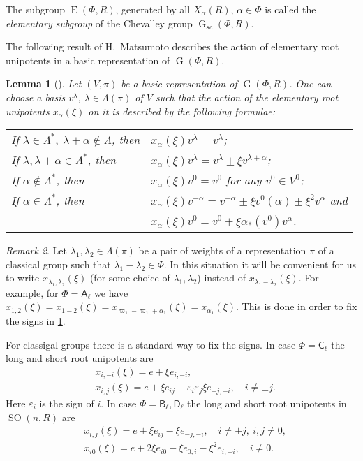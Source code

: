 \documentclass[12pt]{amsart}
\theoremstyle{plain} \declaretheorem[name=Theorem, Refname={Theorem,Theorems}]{thm} \Crefname{thm}{Theorem}{Theorems}
\numberwithin{equation}{section}
\newtheorem{lemma}{Lemma} \numberwithin{lemma}{section} \Crefname{lemma}{Lemma}{Lemmas}
\theoremstyle{definition} \newtheorem{dfn}[lemma]{Definition} \Crefname{dfn}{Definition}{Definitions}
\theoremstyle{remark} \newtheorem{rem}[lemma]{Remark} \Crefname{rem}{Remark}{Remarks}
\DeclareMathOperator{\G}{G}
\DeclareMathOperator{\SO}{SO}
\DeclareMathOperator{\E}{E}
\newcommand{\rA}{\mathsf{A}}
\newcommand{\rB}{\mathsf{B}}
\newcommand{\rC}{\mathsf{C}}
\newcommand{\rD}{\mathsf{D}}
\begin{document}
The subgroup $\E(\Phi, R)$, generated by all $X_\alpha(R)$, $\alpha\in\Phi$ is called the {\it elementary subgroup} of the Chevalley group $\G_{sc}(\Phi, R)$.

The following result of H.~Matsumoto describes the action of elementary root unipotents in a basic representation of $\G(\Phi, R)$.
\begin{lemma}[{\cite[Lemma~2.3]{Ma69}}]\label{lemma:Matsumoto}
Let $(V, \pi)$ be a basic representation of $\G(\Phi, R)$.
One can choose a basis $v^\lambda$, $\lambda\in\Lambda(\pi)$ of $V$ such that the action of the elementary root unipotents $x_\alpha(\xi)$ on it is described by the following formulae:
 
\begin{tabular}{ll}
If $\lambda\in\Lambda^*,\ \lambda+\alpha\notin\Lambda$, then & $x_\alpha(\xi)v^\lambda=v^\lambda$; \\
If $\lambda,\lambda+\alpha\in\Lambda^*$, then & $x_\alpha(\xi)v^\lambda=v^\lambda\pm\xi v^{\lambda+\alpha}$; \\
If $\alpha\notin\Lambda^*$, then & $x_\alpha(\xi)v^0=v^0$ for any $v^0\in V^0$; \\
If $\alpha\in\Lambda^*$, then & $x_\alpha(\xi)v^{-\alpha}=v^{-\alpha}\pm\xi v^0(\alpha)\pm\xi^2 v^\alpha$ and \\
& $x_\alpha(\xi)v^0=v^0\pm\xi\alpha_*(v^0)v^\alpha$.
\end{tabular}
\end{lemma}

\begin{rem}
Let $\lambda_1, \lambda_2 \in \Lambda(\pi)$ be a pair of weights of a representation $\pi$ of a classical group such that $\lambda_1-\lambda_2\in \Phi$.
In this situation it will be convenient for us to write $x_{\lambda_1,\lambda_2}(\xi)$ (for some choice of $\lambda_1,\lambda_2$) instead of $x_{\lambda_1-\lambda_2}(\xi)$.
For example, for $\Phi=\rA_\ell$ we have $x_{1,2}(\xi)=x_{1-2}(\xi)=x_{\varpi_1 - \varpi_1 + \alpha_1}(\xi) = x_{\alpha_1}(\xi)$. This is done in order to fix the signs in \cref{lemma:Matsumoto}.
\end{rem}
For classigal groups there is a standard way to fix the signs.
In case $\Phi=\rC_\ell$ the long and short root unipotents are
\begin{align*}
& x_{i,-i}(\xi)=e+\xi e_{i,-i}, \\ 
& x_{i,j}(\xi)=e+\xi e_{ij}-\varepsilon_i\varepsilon_j\xi e_{-j,-i},\quad i\neq\pm j.
\end{align*}
Here $\varepsilon_i$ is the sign of $i$.
In case $\Phi=\rB_\ell,\rD_\ell$ the long and short root unipotents in $\SO(n,R)$ are
\begin{align*}
& x_{i,j}(\xi)=e+\xi e_{ij}-\xi e_{-j,-i},\quad i\neq\pm j,\ i,j\neq0, \\
& x_{i0}(\xi)=e+2\xi e_{i0}-\xi e_{0,i}-\xi^2 e_{i,-i},\quad i\neq0.
\end{align*}
\end{document}

